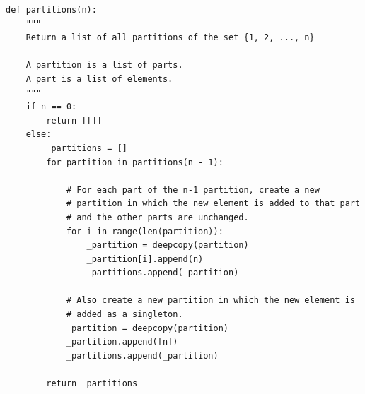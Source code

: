\documentclass[12pt]{article}
\begin{document}
\begin{mdframed}
\begin{verbatim}
def partitions(n):
    """
    Return a list of all partitions of the set {1, 2, ..., n}

    A partition is a list of parts.
    A part is a list of elements.
    """
    if n == 0:
        return [[]]
    else:
        _partitions = []
        for partition in partitions(n - 1):

            # For each part of the n-1 partition, create a new
            # partition in which the new element is added to that part
            # and the other parts are unchanged.
            for i in range(len(partition)):
                _partition = deepcopy(partition)
                _partition[i].append(n)
                _partitions.append(_partition)

            # Also create a new partition in which the new element is
            # added as a singleton.
            _partition = deepcopy(partition)
            _partition.append([n])
            _partitions.append(_partition)

        return _partitions
  \end{verbatim}
\end{mdframed}

\newpage
\end{document}
